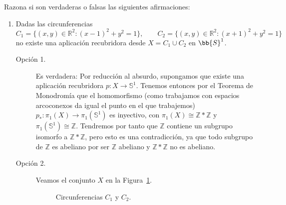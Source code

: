 \documentclass[12pt]{article}
\begin{document}
    \begin{ejercicio}
        Razona si son verdaderas o falsas las siguientes afirmaciones:
        \begin{enumerate}[label=\alph*)]
            \item Dadas las circunferencias
                \begin{equation*}
                    C_1 = \{(x,y)\in \mathbb{R}^2 : {(x-1)}^{2}+y^2 = 1\}, \qquad C_2 = \{(x,y)\in \mathbb{R}^2 : {(x+1)}^{2}+y^2 = 1\}
                \end{equation*}
                no existe una aplicación recubridora desde $X=C_1\cup C_2$ en $\bb{S}^1$.\\

                \begin{description}
                    \item[Opción 1.] Es verdadera: Por reducción al absurdo, supongamos que existe una aplicación recubridora $p:X\to \mathbb{S}^1$. Tenemos entonces por el Teorema de Monodromía que el homomorfismo (como trabajamos con espacios arcoconexos da igual el punto en el que trabajemos) $p_\ast:\pi_1(X)\to \pi_1(\mathbb{S}^1)$ es inyectivo, con $\pi_1(X)\cong \mathbb{Z}\ast\mathbb{Z}$ y $\pi_1(\mathbb{S}^1)\cong \mathbb{Z}$. Tendremos por tanto que $\mathbb{Z}$ contiene un subgrupo isomorfo a $\mathbb{Z}\ast\mathbb{Z}$, pero esto es una contradicción, ya que todo subgrupo de $\mathbb{Z}$ es abeliano por ser $\mathbb{Z}$ abeliano y $\mathbb{Z}\ast\mathbb{Z}$ no es abeliano.
                    
                    \item[Opción 2.] Veamos el conjunto $X$ en la Figura~\ref{fig:circulos}.
                    \begin{figure}[h]
                        \centering
                        \caption{Circunferencias $C_1$ y $C_2$.}
                        \label{fig:circulos}
                    \end{figure}


\end{description}
\end{enumerate}
\end{ejercicio}
\end{document}
